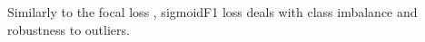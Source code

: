 Similarly to the focal loss \cite{focalLoss}, sigmoidF1 loss deals with class imbalance and robustness to outliers.

















